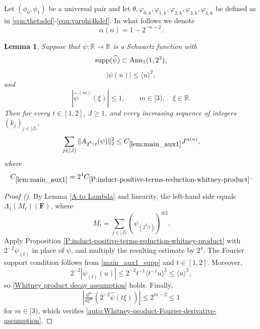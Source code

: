 \documentclass[12pt,reqno]{amsart}
\newcommand{\auto}{{({\tiny\faCar})}}
\theoremstyle{plain}
\newtheorem{lemma}[theorem]{Lemma}
\numberwithin{equation}{section}
\theoremstyle{remark}
\newcommand{\using}[1]{}
\newcommand{\R}{{\mathbb R}}
\newcommand{\F}{\mathbf{F}}
\begin{document}
Let $(\phi_0, \phi_1)$ be a universal pair
and let $\theta, \varphi_{0,k}, \varphi_{1,k}, \varphi_{2,k}, \varphi_{3,k}, \varphi_{4,k}$ be defined as in \eqref{eqn:thetadef}-\eqref{eqn:varphi4kdef}.
In what follows we denote
\begin{equation}\label{variation exponent alpha}
\alpha(n)=1-2^{-n+2}.
\end{equation}

\begin{lemma}\label{lem:main_aux1}\using{A to Lambda}\using{P:induct-positive-terms-reduction-whitney-product}
Suppose that $\psi:\R\to\R$ is a Schwartz function with
\begin{equation}\label{main_aux1_supp}
{\rm supp}(\widehat\psi)\subset\mathrm{Ann}_1(1,2^2),
\end{equation}
\begin{equation}\label{main_aux1_decay}
|\psi(u)|\le\langle u\rangle^2,
\end{equation}
and
\begin{equation}\label{auto:main-auxiliary-one-Fourier-derivative-assumption}
|\widehat\psi^{(m)}(\xi)|\le1,
\qquad
m\in[3),
\quad
\xi\in\R.
\end{equation}
Then for every $t\in[1,2]$, $J\ge1$, and every increasing sequence of integers $(k_j)_{j\in[J)}$,
\begin{equation}\label{main_aux1}
\sum_{j\in[J)}\|A_{2^{k_j}t}(\psi)\|_2^2
\le C_{\ref{lem:main_aux1}}J^{\alpha(n)},
\end{equation}
where
\begin{equation}\label{auto:main-auxiliary-one-constant-definition}
C_{\ref{lem:main_aux1}}
=2^4C_{\ref{P:induct-positive-terms-reduction-whitney-product}}.
\end{equation}
\end{lemma}

\begin{proof}[Proof \auto]
By Lemma \ref{A to Lambda} and linearity, the left-hand side equals $\Lambda_1(M_t)(\F)$, where
\[
M_t=\sum_{j\in[J)}(\psi_{(2^{k_j}t)})^{\otimes2}.
\]
Apply Proposition \ref{P:induct-positive-terms-reduction-whitney-product} with $2^{-2}\psi_{(t)}$ in place of $\psi$, and multiply the resulting estimate by $2^4$. The Fourier support condition follows from \eqref{main_aux1_supp} and $t\in[1,2]$. Moreover,
\[
2^{-2}|\psi_{(t)}(u)|
\le2^{-2}t^{-1}\langle t^{-1}u\rangle^2
\le\langle u\rangle^2,
\]
so \eqref{Whitney product decay assumption} holds. Finally,
\[
\left|\tfrac{d^m}{d\xi^m}
\left(2^{-2}\widehat\psi(t\xi)\right)\right|
\le2^{m-2}\le1
\]
for $m\in[3)$, which verifies \eqref{auto:Whitney-product-Fourier-derivative-assumption}.
\end{proof}
\end{document}
